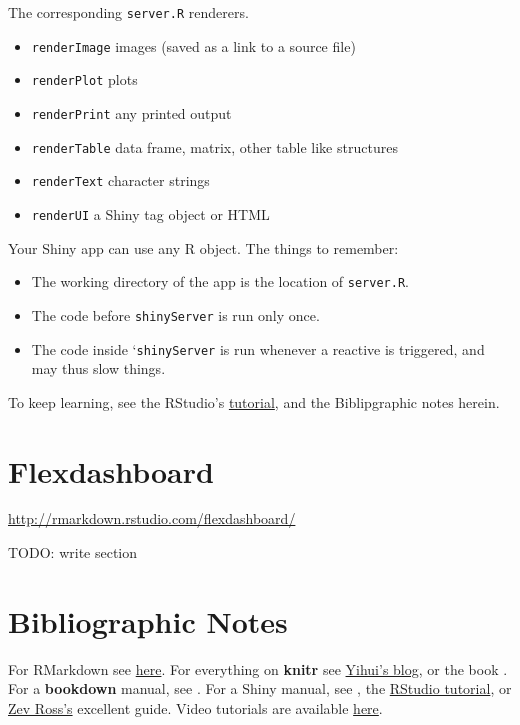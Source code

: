\documentclass[]{book}
\providecommand{\tightlist}{%
  \setlength{\itemsep}{0pt}\setlength{\parskip}{0pt}}
\theoremstyle{definition}
\theoremstyle{definition}
\theoremstyle{definition}
\theoremstyle{remark}
\begin{document}
The corresponding \texttt{server.R} renderers.

\begin{itemize}
\tightlist
\item
  \texttt{renderImage} images (saved as a link to a source file)
\item
  \texttt{renderPlot} plots
\item
  \texttt{renderPrint} any printed output
\item
  \texttt{renderTable} data frame, matrix, other table like structures
\item
  \texttt{renderText} character strings
\item
  \texttt{renderUI} a Shiny tag object or HTML
\end{itemize}

Your Shiny app can use any R object. The things to remember:

\begin{itemize}
\tightlist
\item
  The working directory of the app is the location of \texttt{server.R}.
\item
  The code before \texttt{shinyServer} is run only once.
\item
  The code inside `\texttt{shinyServer} is run whenever a reactive is
  triggered, and may thus slow things.
\end{itemize}

To keep learning, see the RStudio's
\href{http://shiny.rstudio.com/tutorial/}{tutorial}, and the
Biblipgraphic notes herein.

\section{Flexdashboard}\label{flexdashboard}

\url{http://rmarkdown.rstudio.com/flexdashboard/}

TODO: write section

\section{Bibliographic Notes}\label{bibliographic-notes-9}

For RMarkdown see \href{http://rmarkdown.rstudio.com/}{here}. For
everything on \textbf{knitr} see
\href{https://yihui.name/knitr/}{Yihui's blog}, or the book
\citet{xie2015dynamic}. For a \textbf{bookdown} manual, see
\citet{xie2016bookdown}. For a Shiny manual, see \citet{shiny}, the
\href{http://shiny.rstudio.com/tutorial/}{RStudio tutorial}, or
\href{http://zevross.com/blog/2016/04/19/r-powered-web-applications-with-shiny-a-tutorial-and-cheat-sheet-with-40-example-apps/}{Zev
Ross's} excellent guide. Video tutorials are available
\href{https://www.rstudio.com/resources/webinars/shiny-developer-conference/}{here}.
\end{document}
